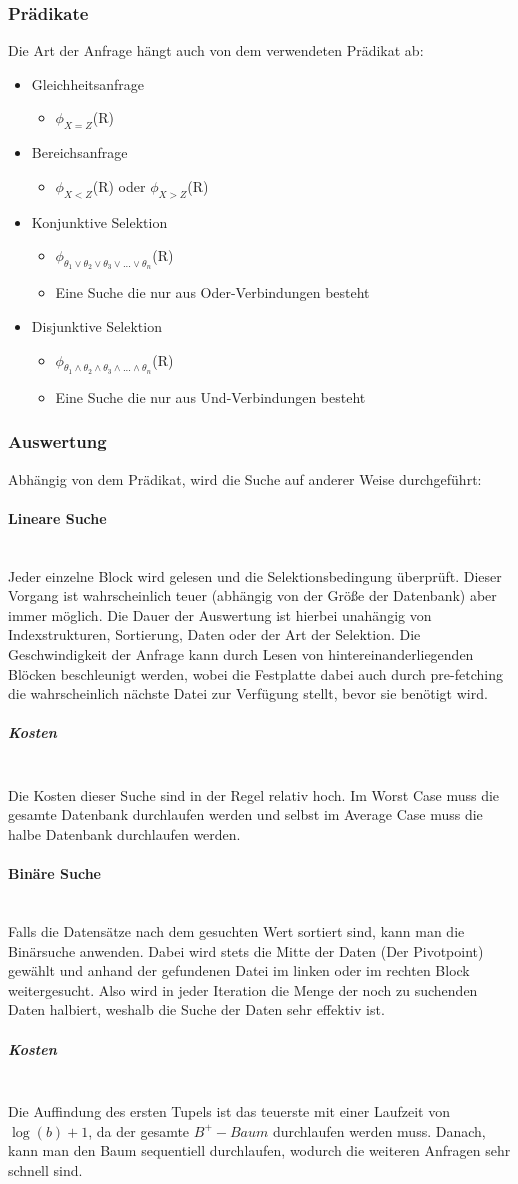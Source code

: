 \documentclass{article}
\newcommand{\paragraphlb}[1]{\paragraph{#1}\mbox{}\\}
\newcommand{\subparagraphlb}[1]{\subparagraph{#1}\mbox{}\\}
\begin{document}
	\subsubsection{Prädikate}
	Die Art der Anfrage hängt auch von dem verwendeten Prädikat ab:
	\begin{itemize}
		\item{Gleichheitsanfrage}
		\begin{itemize}
			\item{$\phi_{X=Z}$(R)}
		\end{itemize}
		\item{Bereichsanfrage}
		\begin{itemize}
			\item{$\phi_{X<Z}$(R) oder $\phi_{X>Z}$(R)}
		\end{itemize}
		\item{Konjunktive Selektion}
		\begin{itemize}
			\item{$\phi_{\theta_1\lor\theta_2\lor\theta_3\lor...\lor\theta_n}$(R)}
			\item{Eine Suche die nur aus Oder-Verbindungen besteht}
		\end{itemize}
		\item{Disjunktive Selektion}
		\begin{itemize}
			\item{$\phi_{\theta_1\land\theta_2\land\theta_3\land...\land\theta_n}$(R)}
			\item{Eine Suche die nur aus Und-Verbindungen besteht}
		\end{itemize}
	\end{itemize}
	\subsubsection{Auswertung}
	Abhängig von dem Prädikat, wird die Suche auf anderer Weise durchgeführt:
	\paragraphlb{Lineare Suche}
	Jeder einzelne Block wird gelesen und die Selektionsbedingung überprüft. Dieser Vorgang ist wahrscheinlich teuer (abhängig von der Größe der Datenbank) aber immer möglich. Die Dauer der Auswertung ist hierbei unahängig von Indexstrukturen, Sortierung, Daten oder der Art der Selektion. Die Geschwindigkeit der Anfrage kann durch Lesen von hintereinanderliegenden Blöcken beschleunigt werden, wobei die Festplatte dabei auch durch pre-fetching die wahrscheinlich nächste Datei zur Verfügung stellt, bevor sie benötigt wird.
	\subparagraphlb{Kosten}
	Die Kosten dieser Suche sind in der Regel relativ hoch. Im Worst Case muss die gesamte Datenbank durchlaufen werden und selbst im Average Case muss die halbe Datenbank durchlaufen werden.
	\paragraphlb{Binäre Suche}
	Falls die Datensätze nach dem gesuchten Wert sortiert sind, kann man die Binärsuche anwenden. Dabei wird stets die Mitte der Daten (Der Pivotpoint) gewählt und anhand der gefundenen Datei im linken oder im rechten Block weitergesucht. Also wird in jeder Iteration die Menge der noch zu suchenden Daten halbiert, weshalb die Suche der Daten sehr effektiv ist.
	\subparagraphlb{Kosten}
	Die Auffindung des ersten Tupels ist das teuerste mit einer Laufzeit von $\log(b) + 1$, da der gesamte $B^+-Baum$ durchlaufen werden muss. Danach, kann man den Baum sequentiell durchlaufen, wodurch die weiteren Anfragen sehr schnell sind.
\end{document}
